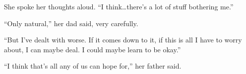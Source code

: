 She spoke her thoughts aloud.  ``I think\ldots there's a lot of stuff bothering me.''



``Only natural,'' her dad said, very carefully.



``But I've dealt with worse.  If it comes down to it, if this is all I have to worry about, I can maybe deal.  I could maybe learn to be okay.''



``I think that's all any of us can hope for,'' her father said.





